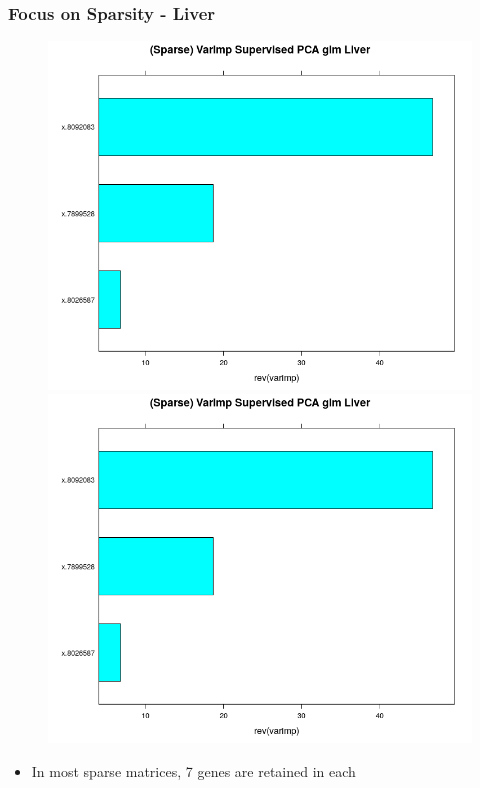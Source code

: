 \documentclass[11pt]{beamer}
\begin{document}
\begin{frame}
\frametitle{Focus on Sparsity - Liver}
{
\begin{figure}
\includegraphics[scale=0.2]{liverVarImp_glmSparse.png}
\includegraphics[scale=0.2]{liverVarImp_lda_Sparse.png}
\end{figure}

\begin{itemize}
\item In most sparse matrices, 7 genes are retained in each
\end{itemize}
}
\end{frame}
\end{document}
